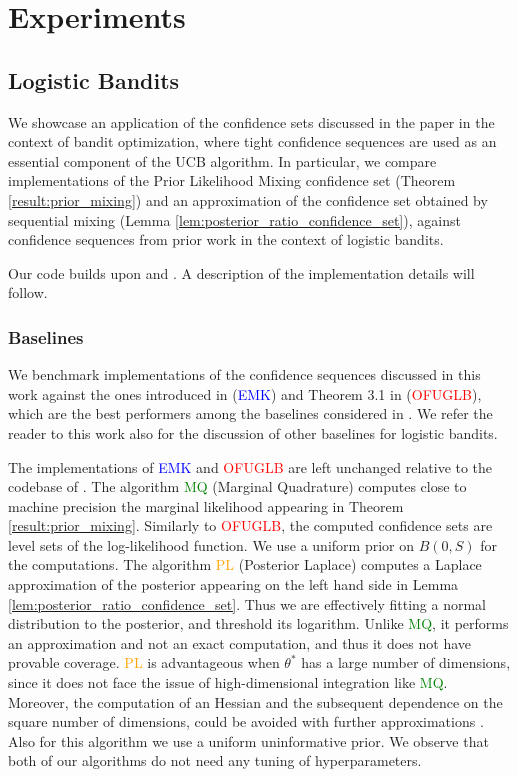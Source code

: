 \section{Experiments}

\subsection{Logistic Bandits}

We showcase an application of the confidence sets discussed in the paper in the context of bandit optimization, where tight confidence sequences are used as an essential component of the UCB algorithm. In particular, we compare implementations of the Prior Likelihood Mixing confidence set (Theorem \ref{result:prior_mixing}) and an approximation of the confidence set obtained by sequential mixing (Lemma \ref{lem:posterior_ratio_confidence_set}), against confidence sequences from prior work in the context of logistic bandits.

Our code builds upon \citep{lee2024unified} and \citep{faury2022jointly}. A description of the implementation details will follow. 

\subsubsection{Baselines} 

We benchmark implementations of the confidence sequences discussed in this work against the ones introduced in \citep{Emm23} (\textcolor{blue}{EMK}) and Theorem 3.1 in \citep{lee2024unified} (\textcolor{red}{OFUGLB}), which are the best performers among the baselines considered in \citep{lee2024unified}. We refer the reader to this work also for the discussion of other baselines for logistic bandits.

The implementations of \textcolor{blue}{EMK} and \textcolor{red}{OFUGLB} are left unchanged relative to the codebase of \citep{lee2024unified}.
The algorithm \textcolor{green}{MQ} (Marginal Quadrature) computes close to machine precision the marginal likelihood appearing in Theorem \ref{result:prior_mixing}. Similarly to  \textcolor{red}{OFUGLB}, the computed confidence sets are level sets of the log-likelihood function. We use a uniform prior on $B(0, S)$ for the computations. 
The algorithm \textcolor{orange}{PL} (Posterior Laplace) computes a Laplace approximation of the posterior appearing on the left hand side in Lemma \ref{lem:posterior_ratio_confidence_set}. Thus we are effectively fitting a normal distribution to the posterior, and threshold its logarithm. Unlike \textcolor{green}{MQ}, it performs an approximation and not an exact computation, and thus it does not have provable coverage. \textcolor{orange}{PL} is advantageous when $\theta^*$ has a large number of dimensions, since it does not face the issue of high-dimensional integration like \textcolor{green}{MQ}. Moreover, the computation of an Hessian and the subsequent dependence on the square number of dimensions, could be avoided with further approximations \citep{antoran2022sampling}. Also for this algorithm we use a uniform uninformative prior.
We observe that both of our algorithms do not need any  tuning of hyperparameters.

